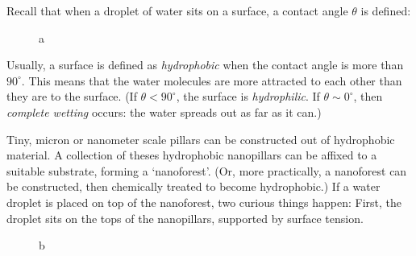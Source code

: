 \documentclass[12pt, a4paper, twoside, openright]{book}
\begin{document}
Recall that when a droplet of water sits on a surface, a contact angle $\theta$ is defined:

\begin{figure}[ht]
\centering
{}
\caption{a}\label{a}
\end{figure}

Usually, a surface is defined as \emph{hydrophobic} when the contact angle is more than $90^{\circ}$.  This means that the water molecules are more attracted to each other than they are to the surface. (If $\theta < 90^{\circ}$, the surface is \emph{hydrophilic}.  If $\theta \sim 0^{\circ}$, then \emph{complete wetting} occurs: the water spreads out as far as it can.)

Tiny, micron or nanometer scale pillars can be constructed out of hydrophobic material.  A collection of theses hydrophobic nanopillars can be affixed to a suitable substrate, forming a `nanoforest'.  (Or, more practically, a nanoforest can be constructed, then chemically treated to become hydrophobic.)  If a water droplet is placed on top of the nanoforest, two curious things happen:  First, the droplet sits on the tops of the nanopillars, supported by surface tension.

\begin{figure}[ht]
\centering
{}
\caption{b}\label{b}
\end{figure}
\end{document}
